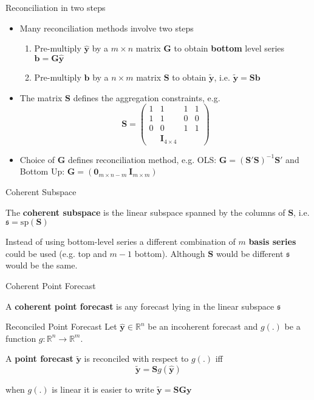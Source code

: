 \documentclass{beamer}
\begin{document}
  \begin{frame}{Reconciliation in two steps}
  	\begin{itemize}
  		\item Many reconciliation methods involve two steps
  		\begin{enumerate}
  			\item Pre-multiply $\hat{\bm y}$ by a $m\times n$ matrix $\bm G$ to obtain {\bf bottom} level series ${\bm b}={\bm G}{\hat{\bm y}}$ 
  			\item Pre-multiply ${\bm b}$ by a $n\times m$ matrix $\bm S$ to obtain ${\tilde{\bm y}}$, i.e. $\tilde{\bm y}={\bm S}{{\bm b}}$
  		\end{enumerate}
  	    \item The matrix ${\bm S}$ defines the aggregation constraints, e.g.
  	    \begin{equation*}
  	    {\bm S}=\begin{pmatrix} 1 &1 &1 &1 \\1 &1 &0 &0 \\0 &0 &1 &1 \\ &{\bm I_{4\times 4}}
  	    \end{pmatrix}
  	    \end{equation*}
  	    \item Choice of ${\bm G}$ defines reconciliation method, e.g. OLS: ${\bm G}=\left(\bm{S}'\bm{S}\right)^{-1}{\bm S'}$ and Bottom Up: ${\bm G}=\left(\bm{0}_{m\times n-m}~\bm{I}_{m\times m}\right)$ 
    \end{itemize}
  \end{frame}
  \begin{frame}{Coherent Subspace}
    \begin{definition} 
	  The {\bf coherent subspace} is the linear subspace spanned by the columns of ${\bm S}$, i.e. $\mathfrak{s}=\mbox{sp}({\bm S})$
    \end{definition}
    Instead of using bottom-level series a different combination of $m$ {\bf basis series} could be used (e.g. top and $m-1$ bottom).  Although ${\bm S}$ would be different $\mathfrak{s}$ would be the same.
  \end{frame}
  \begin{frame}{Coherent Point Forecast}
  \begin{definition} 
  	A {\bf coherent point forecast} is any forecast lying in the linear subspace $\mathfrak{s}$
  \end{definition}
  \end{frame}
  \begin{frame}{Reconciled Point Forecast}
  Let $\hat{\bm y}\in\mathbb{R}^n$ be an incoherent forecast and $g(.)$ be a function $g:\mathbb{R}^n\rightarrow\mathbb{R}^m$.
  \begin{definition} 
	A {\bf point forecast} $\tilde{\bm y}$ is reconciled with respect to $g(.)$ iff 
	\begin{equation*}
    \tilde{\bm y}={\bm S}g(\hat{\bm y})
	\end{equation*}
  \end{definition}
  when $g(.)$ is linear it is easier to write $\tilde{\bm y}={\bm S}{\bm G}{\bm y}$
  \end{frame}
\end{document}
